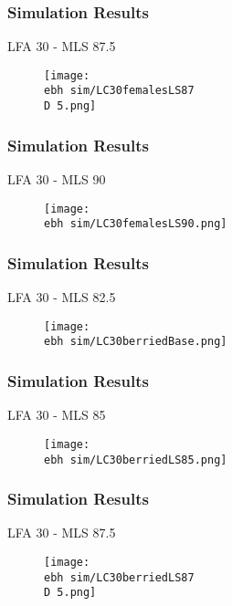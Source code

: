 \documentclass{beamer}
\newcommand{\ebh}{\string~/bio.data/bio.lobster/figures/LFA2733Framework2018/} %
\newcommand{\D}{.}
\begin{document}
\begin{frame}
\frametitle{Simulation Results}
LFA 30 - MLS 87.5
\begin{figure}
        \begin{center}
            \texttt{[image: \\ebh sim/LC30femalesLS87\\D 5.png]}
        \end{center}
    \end{figure}
\end{frame}


\begin{frame}
\frametitle{Simulation Results}
LFA 30 - MLS 90
\begin{figure}
        \begin{center}
            \texttt{[image: \\ebh sim/LC30femalesLS90.png]}
        \end{center}
    \end{figure}
\end{frame}





\begin{frame}
\frametitle{Simulation Results}
LFA 30 - MLS 82.5
\begin{figure}
        \begin{center}
            \texttt{[image: \\ebh sim/LC30berriedBase.png]}
        \end{center}
    \end{figure}
\end{frame}



\begin{frame}
\frametitle{Simulation Results}
LFA 30 - MLS 85
\begin{figure}
        \begin{center}
            \texttt{[image: \\ebh sim/LC30berriedLS85.png]}
        \end{center}
    \end{figure}
\end{frame}


\begin{frame}
\frametitle{Simulation Results}
LFA 30 - MLS 87.5
\begin{figure}
        \begin{center}
            \texttt{[image: \\ebh sim/LC30berriedLS87\\D 5.png]}
        \end{center}
    \end{figure}
\end{frame}
\end{document}
